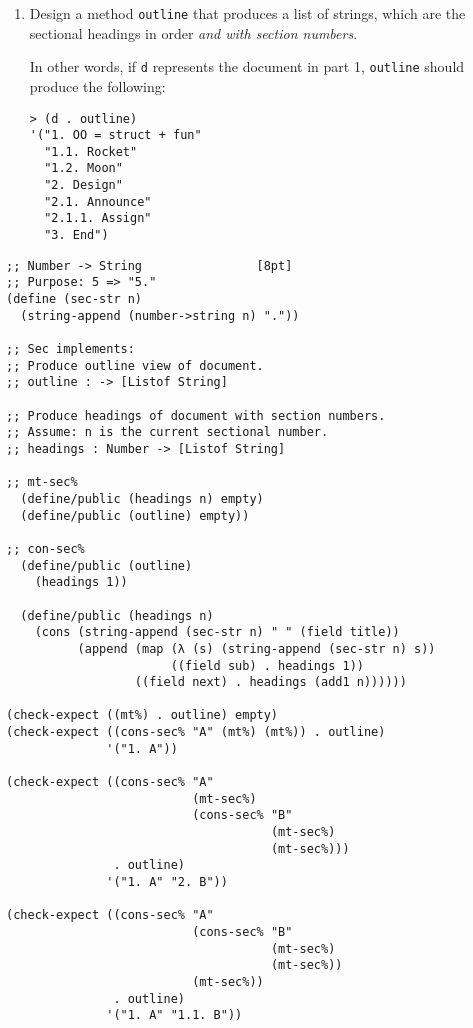 \documentclass[12pt]{article}                   %
\newenvironment{solution}{}{}
\begin{document}
\begin{problem}
\begin{enumerate}
\newpage
\item Design a method \verb|outline| that produces a list of strings,
  which are the sectional headings in order \emph{and with section
    numbers}.

In other words, if \verb|d| represents the document in part 1,
\verb|outline| should produce the following:
\begin{verbatim}
> (d . outline)
'("1. OO = struct + fun"
  "1.1. Rocket"
  "1.2. Moon"
  "2. Design"
  "2.1. Announce"
  "2.1.1. Assign"
  "3. End")
\end{verbatim}
\end{enumerate}

\begin{solution}
\begin{verbatim}
;; Number -> String                [8pt]
;; Purpose: 5 => "5."
(define (sec-str n)
  (string-append (number->string n) "."))

;; Sec implements:
;; Produce outline view of document.
;; outline : -> [Listof String]

;; Produce headings of document with section numbers.
;; Assume: n is the current sectional number.
;; headings : Number -> [Listof String]

;; mt-sec%
  (define/public (headings n) empty)
  (define/public (outline) empty))

;; con-sec%
  (define/public (outline)
    (headings 1))
    
  (define/public (headings n)
    (cons (string-append (sec-str n) " " (field title))
          (append (map (λ (s) (string-append (sec-str n) s))
                       ((field sub) . headings 1))
                  ((field next) . headings (add1 n))))))

(check-expect ((mt%) . outline) empty)
(check-expect ((cons-sec% "A" (mt%) (mt%)) . outline)
              '("1. A"))

(check-expect ((cons-sec% "A" 
                          (mt-sec%) 
                          (cons-sec% "B" 
                                     (mt-sec%) 
                                     (mt-sec%))) 
               . outline)
              '("1. A" "2. B"))

(check-expect ((cons-sec% "A" 
                          (cons-sec% "B" 
                                     (mt-sec%) 
                                     (mt-sec%))
                          (mt-sec%))
               . outline)
              '("1. A" "1.1. B"))
\end{verbatim}
\end{solution}

\end{problem}
\end{document}
